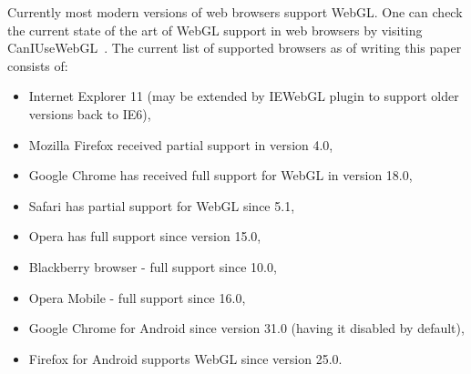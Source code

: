 Currently most modern versions of web browsers support WebGL.
One can check the current state of the art of WebGL support in web browsers by visiting CanIUseWebGL~\cite{webgl_support}.
The current list of supported browsers as of writing this paper consists of:
\begin{itemize}
\item Internet Explorer 11 (may be extended by IEWebGL plugin \cite{iewebgl} to support older versions back to IE6),
\item Mozilla Firefox received partial support in version 4.0,
\item Google Chrome has received full support for WebGL in version 18.0,
\item Safari has partial support for WebGL since 5.1,
\item Opera has full support since version 15.0,
\item Blackberry browser - full support since 10.0,
\item Opera Mobile - full support since 16.0,
\item Google Chrome for Android since version 31.0 (having it disabled by default),
\item Firefox for Android supports WebGL since version 25.0.
\end{itemize}